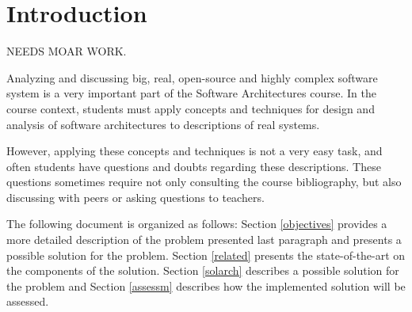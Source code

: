 
\chapter{Introduction}
\label{chapter:introduction}

NEEDS MOAR WORK.

Analyzing and discussing big, real, open-source and highly complex software system is a very important part of the Software Architectures course. In the course context, students must apply concepts and techniques for design and analysis of software architectures to descriptions of real systems. 

However, applying these concepts and techniques is not a very easy task, and often students have questions and doubts regarding these descriptions. These questions sometimes require not only consulting the course bibliography, but also discussing with peers or asking questions to teachers.

The following document is organized as follows: Section \ref{objectives} provides a more detailed description of the problem presented last paragraph and presents a possible solution for the problem. Section \ref{related} presents the state-of-the-art on the components of the solution. Section \ref{solarch} describes a possible solution for the problem and Section \ref{assessm} describes how the implemented solution will be assessed.
